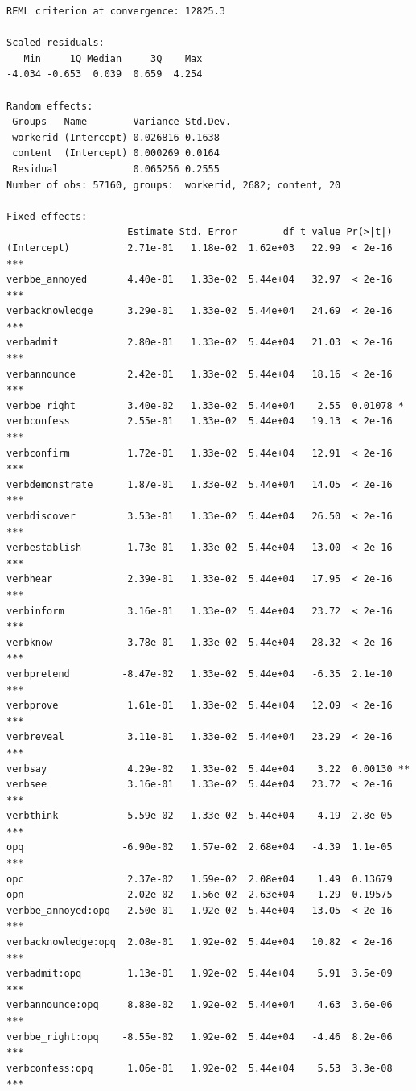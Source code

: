 \documentclass[10pt]{article}\usepackage[]{graphicx}\usepackage[]{color}
\makeatletter
\newenvironment{kframe}{%
 \def\at@end@of@kframe{}%
 \ifinner\ifhmode%
  \def\at@end@of@kframe{\end{minipage}}%
  \begin{minipage}{\columnwidth}%
 \fi\fi%
 \def\FrameCommand##1{\hskip\@totalleftmargin \hskip-\fboxsep
 \colorbox{shadecolor}{##1}\hskip-\fboxsep
     \hskip-\linewidth \hskip-\@totalleftmargin \hskip\columnwidth}%
 \MakeFramed {\advance\hsize-\width
   \@totalleftmargin\z@ \linewidth\hsize
   \@setminipage}}%
 {\par\unskip\endMakeFramed%
 \at@end@of@kframe}
\newenvironment{knitrout}{}{} %
\makeatother
\begin{document}
\begin{knitrout}
\begin{kframe}
\begin{verbatim}
REML criterion at convergence: 12825.3

Scaled residuals: 
   Min     1Q Median     3Q    Max 
-4.034 -0.653  0.039  0.659  4.254 

Random effects:
 Groups   Name        Variance Std.Dev.
 workerid (Intercept) 0.026816 0.1638  
 content  (Intercept) 0.000269 0.0164  
 Residual             0.065256 0.2555  
Number of obs: 57160, groups:  workerid, 2682; content, 20

Fixed effects:
                     Estimate Std. Error        df t value Pr(>|t|)    
(Intercept)          2.71e-01   1.18e-02  1.62e+03   22.99  < 2e-16 ***
verbbe_annoyed       4.40e-01   1.33e-02  5.44e+04   32.97  < 2e-16 ***
verbacknowledge      3.29e-01   1.33e-02  5.44e+04   24.69  < 2e-16 ***
verbadmit            2.80e-01   1.33e-02  5.44e+04   21.03  < 2e-16 ***
verbannounce         2.42e-01   1.33e-02  5.44e+04   18.16  < 2e-16 ***
verbbe_right         3.40e-02   1.33e-02  5.44e+04    2.55  0.01078 *  
verbconfess          2.55e-01   1.33e-02  5.44e+04   19.13  < 2e-16 ***
verbconfirm          1.72e-01   1.33e-02  5.44e+04   12.91  < 2e-16 ***
verbdemonstrate      1.87e-01   1.33e-02  5.44e+04   14.05  < 2e-16 ***
verbdiscover         3.53e-01   1.33e-02  5.44e+04   26.50  < 2e-16 ***
verbestablish        1.73e-01   1.33e-02  5.44e+04   13.00  < 2e-16 ***
verbhear             2.39e-01   1.33e-02  5.44e+04   17.95  < 2e-16 ***
verbinform           3.16e-01   1.33e-02  5.44e+04   23.72  < 2e-16 ***
verbknow             3.78e-01   1.33e-02  5.44e+04   28.32  < 2e-16 ***
verbpretend         -8.47e-02   1.33e-02  5.44e+04   -6.35  2.1e-10 ***
verbprove            1.61e-01   1.33e-02  5.44e+04   12.09  < 2e-16 ***
verbreveal           3.11e-01   1.33e-02  5.44e+04   23.29  < 2e-16 ***
verbsay              4.29e-02   1.33e-02  5.44e+04    3.22  0.00130 ** 
verbsee              3.16e-01   1.33e-02  5.44e+04   23.72  < 2e-16 ***
verbthink           -5.59e-02   1.33e-02  5.44e+04   -4.19  2.8e-05 ***
opq                 -6.90e-02   1.57e-02  2.68e+04   -4.39  1.1e-05 ***
opc                  2.37e-02   1.59e-02  2.08e+04    1.49  0.13679    
opn                 -2.02e-02   1.56e-02  2.63e+04   -1.29  0.19575    
verbbe_annoyed:opq   2.50e-01   1.92e-02  5.44e+04   13.05  < 2e-16 ***
verbacknowledge:opq  2.08e-01   1.92e-02  5.44e+04   10.82  < 2e-16 ***
verbadmit:opq        1.13e-01   1.92e-02  5.44e+04    5.91  3.5e-09 ***
verbannounce:opq     8.88e-02   1.92e-02  5.44e+04    4.63  3.6e-06 ***
verbbe_right:opq    -8.55e-02   1.92e-02  5.44e+04   -4.46  8.2e-06 ***
verbconfess:opq      1.06e-01   1.92e-02  5.44e+04    5.53  3.3e-08 ***

\end{verbatim}
\end{kframe}
\end{knitrout}
\end{document}
